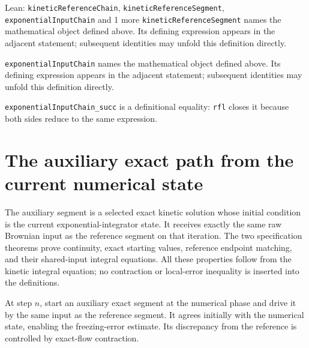 \documentclass[11pt,a4paper]{article}
\begin{document}
\begin{leanbox}{Lean: \texttt{kineticReferenceChain}, \texttt{kineticReferenceSegment}, \texttt{exponentialInputChain} and 1 more}
\texttt{kinetic\allowbreak{}Reference\allowbreak{}Segment} names the mathematical object defined above. Its defining expression appears in the adjacent statement; subsequent identities may unfold this definition directly.




\texttt{exponential\allowbreak{}Input\allowbreak{}Chain} names the mathematical object defined above. Its defining expression appears in the adjacent statement; subsequent identities may unfold this definition directly.




\texttt{exponential\allowbreak{}Input\allowbreak{}Chain\_\allowbreak{}succ} is a definitional equality: \texttt{rfl} closes it because both sides reduce to the same expression.
\end{leanbox}

\section{\texorpdfstring{The auxiliary exact path from the current numerical state}{The auxiliary exact path from the current numerical state}}


The auxiliary segment is a selected exact kinetic solution whose initial condition is the current exponential-integrator state. It receives exactly the same raw Brownian input as the reference segment on that iteration. The two specification theorems prove continuity, exact starting values, reference endpoint matching, and their shared-input integral equations. All these properties follow from the kinetic integral equation; no contraction or local-error inequality is inserted into the definitions.



At step \(n\), start an auxiliary exact segment at the numerical phase and drive it by the same input as the reference segment. It agrees initially with the numerical state, enabling the freezing-error estimate. Its discrepancy from the reference is controlled by exact-flow contraction.
\end{document}
